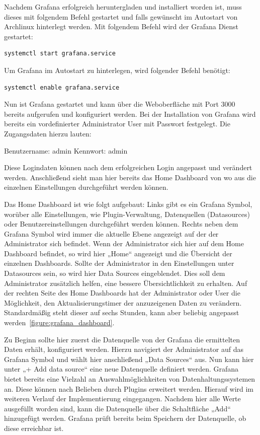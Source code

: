 Nachdem Grafana erfolgreich heruntergladen und installiert worden ist, muss
dieses mit folgendem Befehl gestartet und falls gewünscht im Autostart von
Archlinux hinterlegt werden. Mit folgendem Befehl wird der Grafana Dienst
gestartet:
\begin{verbatim}
systemctl start grafana.service
\end{verbatim}

Um Grafana im Autostart zu hinterlegen, wird folgender Befehl benötigt:
\begin{verbatim}
systemctl enable grafana.service
\end{verbatim}

Nun ist Grafana gestartet und kann über die Weboberfläche mit Port 3000
bereits aufgerufen und konfiguriert werden. Bei der Installation von Grafana
wird bereits ein vordefinierter Administrator User mit Passwort festgelegt. Die
Zugangsdaten hierzu lauten:

\begin{outline}
  \1 Benutzername: admin
  \1 Kennwort: admin
\end{outline}

Diese Logindaten können nach dem erfolgreichen Login angepasst und verändert
werden. Anschließend sieht man hier bereits das Home Dashboard von wo aus die
einzelnen Einstellungen durchgeführt werden können.

Das Home Dashboard ist wie folgt aufgebaut: Links gibt es ein Grafana Symbol,
worüber alle Einstellungen, wie Plugin-Verwaltung, Datenquellen (Datasources)
oder Benutzereinstellungen durchgeführt werden können. Rechts neben dem Grafana
Symbol wird immer die aktuelle Ebene angezeigt auf der der Administrator sich
befindet. Wenn der Administrator sich hier auf dem Home Dashboard befindet, so
wird hier „Home“ angezeigt und die Übersicht der einzelnen Dashboards. Sollte
der Administrator in den Einstellungen unter Datasources sein, so wird hier
Data Sources eingeblendet. Dies soll dem Administrator zusätzlich helfen, eine
bessere Übersichtlichkeit zu erhalten. Auf der rechten Seite des Home
Dashboards hat der Administrator oder User die Möglichkeit, den
Aktualisierungstimer der anzuzeigenen Daten zu verändern. Standardmäßig steht
dieser auf sechs Stunden, kann aber beliebig angepasst
werden~\ref{figure:grafana_dashboard}.


Zu Beginn sollte hier zuerst die Datenquelle von der Grafana die ermittelten
Daten erhält, konfiguriert werden. Hierzu navigiert der Administrator auf das
Grafana Symbol und wählt hier anschließend „Data Sources“ aus. Nun kann hier
unter „+ Add data source“ eine neue Datenquelle definiert werden. Grafana
bietet bereits eine Vielzahl an Auswahlmöglichkeiten von Datenhaltungssystemen
an. Diese können nach Belieben durch Plugins erweitert werden. Hierauf wird im
weiteren Verlauf der Implementierung eingegangen. Nachdem hier alle Werte
ausgefüllt worden sind, kann die Datenquelle über die Schaltfläche „Add“
hinzugefügt werden. Grafana prüft bereits beim Speichern der Datenquelle, ob
diese erreichbar ist.

